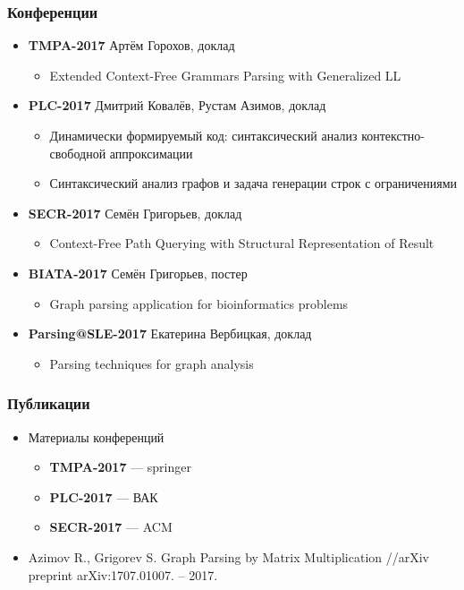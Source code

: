 \documentclass[xcolor=table]{beamer}
\begin{document}
\begin{frame}[fragile]
  \transwipe[direction=90]
  \frametitle{Конференции}
\begin{itemize}
      \item \textbf{TMPA-2017}  Артём Горохов, доклад
            \begin{itemize}
      \item Extended Context-Free Grammars Parsing with Generalized LL
      \end{itemize}

      \item \textbf{PLC-2017}   Дмитрий Ковалёв, Рустам Азимов, доклад
            \begin{itemize}
      \item Динамически формируемый код: синтаксический анализ контекстно-свободной аппроксимации
      \item Синтаксический анализ графов и задача генерации строк с ограничениями
      \end{itemize}

      \item \textbf{SECR-2017}  Семён Григорьев, доклад
            \begin{itemize}
      \item Context-Free Path Querying with Structural Representation of Result
      \end{itemize}

      \item \textbf{BIATA-2017} Семён Григорьев, постер
      \begin{itemize}
      \item Graph parsing application for bioinformatics problems
      \end{itemize}
      \item \textbf{Parsing@SLE-2017} Екатерина Вербицкая, доклад
            \begin{itemize}
      \item Parsing techniques for graph analysis
      \end{itemize}

\end{itemize}
\end{frame}

\begin{frame}[fragile]
  \transwipe[direction=90]
  \frametitle{Публикации}
\begin{itemize}
      \item Материалы конференций
        \begin{itemize}
          \item \textbf{TMPA-2017} --- springer
          \item \textbf{PLC-2017} --- ВАК
          \item \textbf{SECR-2017} --- ACM
        \end{itemize}
      \item Azimov R., Grigorev S. Graph Parsing by Matrix Multiplication //arXiv preprint arXiv:1707.01007. – 2017.
\end{itemize}
\end{frame}
\end{document}
